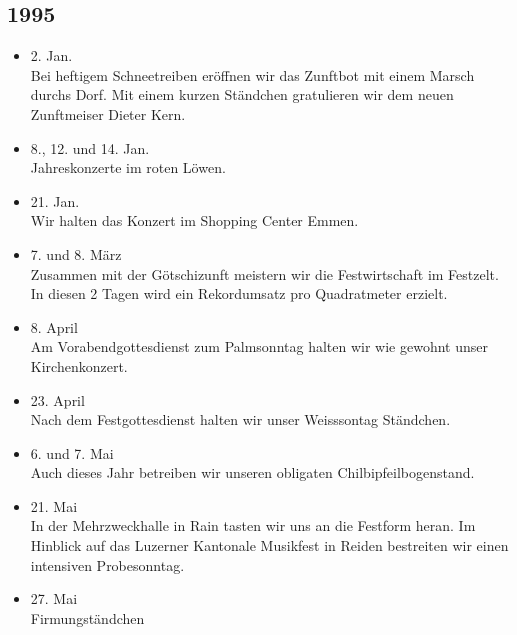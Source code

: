 \subsection*{1995}

\begin{history}


    \begin{itemize}

        \item 2. Jan.\\
              Bei heftigem Schneetreiben eröffnen wir das Zunftbot mit einem Marsch
              durchs Dorf. Mit einem kurzen Ständchen gratulieren wir dem neuen
              Zunftmeiser Dieter Kern.

        \item 8., 12. und 14. Jan.\\
              Jahreskonzerte im roten Löwen.

        \item 21. Jan.\\
              Wir halten das Konzert im Shopping Center Emmen.

        \item 7. und 8. März\\
              Zusammen mit der Götschizunft meistern wir die Festwirtschaft im
              Festzelt. In diesen 2 Tagen wird ein Rekordumsatz pro Quadratmeter
              erzielt.

        \item 8. April\\
              Am Vorabendgottesdienst zum Palmsonntag halten wir wie gewohnt unser
              Kirchenkonzert.

        \item 23. April\\
              Nach dem Festgottesdienst halten wir unser Weisssontag Ständchen.

        \item 6. und 7. Mai\\
              Auch dieses Jahr betreiben wir unseren obligaten Chilbipfeilbogenstand.

        \item 21. Mai\\
              In der Mehrzweckhalle in Rain tasten wir uns an die Festform heran. Im
              Hinblick auf das Luzerner Kantonale Musikfest in Reiden bestreiten wir
              einen intensiven Probesonntag.

        \item 27. Mai\\
              Firmungständchen


\end{itemize}
\end{history}
